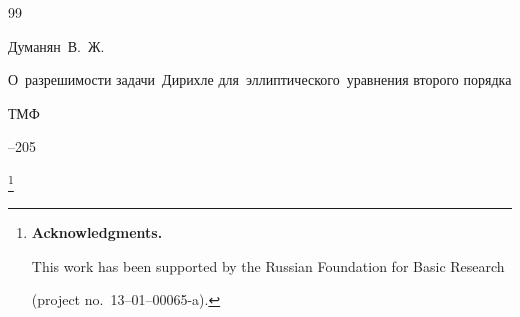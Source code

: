 \begin{thebibliography}{99}

\by Думанян~В.~Ж.

\paper О~разрешимости задачи~Дирихле для~эллиптического~уравнения второго порядка

\jour ТМФ




--205


















\end{thebibliography}







\RuDate






\bigskip



\makeentitle







\thanks{\textbf{Acknowledgments.} 

This work has been supported by the Russian Foundation for Basic Research

 (project no.~13--01--00065-a).}







